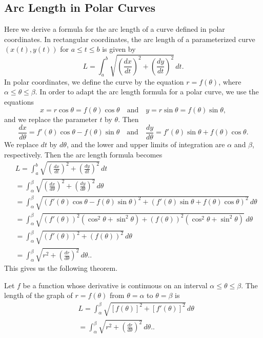 \documentclass{report}
\begin{document}
     \bigbreak \noindent 
     \subsection{Arc Length in Polar Curves}
     \bigbreak \noindent 
     Here we derive a formula for the arc length of a curve defined in polar coordinates.
     \bigbreak \noindent 
     In rectangular coordinates, the arc length of a parameterized curve \((x(t), y(t))\) for \(a \leq t \leq b\) is given by
     \[ L = \int_{a}^{b} \sqrt{\left(\frac{dx}{dt}\right)^2 + \left(\frac{dy}{dt}\right)^2} \, dt. \]
     In polar coordinates, we define the curve by the equation \( r = f(\theta) \), where \( \alpha \leq \theta \leq \beta \). In order to adapt the arc length formula for a polar curve, we use the equations
     \[ x = r \cos \theta = f(\theta) \cos \theta \quad \text{and} \quad y = r \sin \theta = f(\theta) \sin \theta, \]
     and we replace the parameter \( t \) by \( \theta \). Then
     \[ \frac{dx}{d\theta} = f'(\theta) \cos \theta - f(\theta) \sin \theta \quad \text{and} \quad \frac{dy}{d\theta} = f'(\theta) \sin \theta + f(\theta) \cos \theta.  \]
     We replace \( dt \) by \( d\theta \), and the lower and upper limits of integration are \( \alpha \) and \( \beta \), respectively. Then the arc length formula becomes
     \begin{align*}
      &L = \int_{a}^{b} \sqrt{\left(\frac{dx}{dt}\right)^2 + \left(\frac{dy}{dt}\right)^2} \, dt  \\
      &= \int_{\alpha}^{\beta} \sqrt{\left(\frac{dx}{d\theta}\right)^2 + \left(\frac{dy}{d\theta}\right)^2} \, d\theta \\
      &= \int_{\alpha}^{\beta} \sqrt{\left(f'(\theta) \cos \theta - f(\theta) \sin \theta\right)^2 + \left(f'(\theta) \sin \theta + f(\theta) \cos \theta\right)^2} \, d\theta \\
      &= \int_{\alpha}^{\beta} \sqrt{(f'(\theta))^2(\cos^2 \theta + \sin^2 \theta) + (f(\theta))^2(\cos^2 \theta + \sin^2 \theta)} \, d\theta \\
      &= \int_{\alpha}^{\beta} \sqrt{(f'(\theta))^2 + (f(\theta))^2} \, d\theta \\
      &= \int_{\alpha}^{\beta} \sqrt{r^2 + \left(\frac{dr}{d\theta}\right)^2} \, d\theta. 
  .\end{align*}
     This gives us the following theorem.

     \bigbreak \noindent 
     \begin{thrmm}
         Let \( f \) be a function whose derivative is continuous on an interval \( \alpha \leq \theta \leq \beta \). The length of the graph of \( r = f(\theta) \) from \( \theta = \alpha \) to \( \theta = \beta \) is
         \begin{align*}
              &L = \int_{\alpha}^{\beta} \sqrt{[f(\theta)]^2 + [f'(\theta)]^2} \, d\theta \\
              &= \int_{\alpha}^{\beta} \sqrt{r^2 + \left(\frac{dr}{d\theta}\right)^2} \, d\theta. 
         .\end{align*}
     \end{thrmm}
\end{document}
